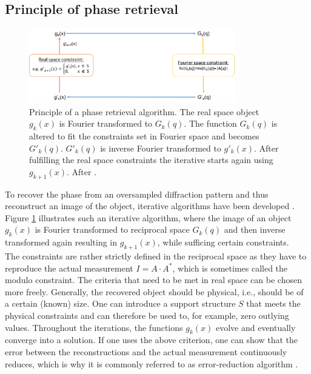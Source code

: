 \subsection{Principle of phase retrieval}\label{sec:phase-retrieval-fundamental}
\begin{figure}
	\centering
		\includegraphics[width=0.80\textwidth]{images/phase-retrieval-algorithm.png}
	\caption[Example of a phase retrieval algorithm.]{Principle of a phase retrieval algorithm. The real space object $g_{k}\left(x\right)$ is Fourier transformed to $G_{k}\left(q\right)$. The function $G_{k}\left(q\right)$ is altered to fit the constraints set in Fourier space and becomes $G'_{k}\left(q\right)$. $G'_{k}\left(q\right)$ is inverse Fourier transformed to $g'_{k}\left(x\right)$. After fulfilling the real space constraints the iterative starts again using $g_{k+1}\left(x\right)$. After \citep{Fienup-1982-AO}.}
	\label{fig:phase-retrieval-algorithm}
\end{figure}
To recover the phase from an oversampled diffraction pattern and thus reconstruct an image of the object, iterative algorithms have been developed \cite{Fienup-1982-AO}. Figure \ref{fig:phase-retrieval-algorithm} illustrates such an iterative algorithm, where the image of an object $g_{k}\left(x\right)$ is Fourier transformed to reciprocal space $G_{k}\left(q\right)$ and then inverse transformed again resulting in $g_{k+1}(x)$, while sufficing certain constraints.\\[1\baselineskip]
%
The constraints are rather strictly defined in the reciprocal space as they have to reproduce the actual measurement $I=A\cdot A^{*}$, which is sometimes called the modulo constraint. The criteria that need to be met in real space can be chosen more freely. Generally, the recovered object should be physical, i.e., should be of a certain (known) size. One can introduce a support structure $S$ that meets the physical constraints and can therefore be used to, for example, zero outlying values. Throughout the iterations, the functions $g_{k}(x)$ evolve and eventually converge into a solution. If one uses the above criterion, one can show that the error between the reconstructions and the actual measurement continuously reduces, which is why it is commonly referred to as error-reduction algorithm \cite{Fienup-1978-OL}.
%
%
%
%
